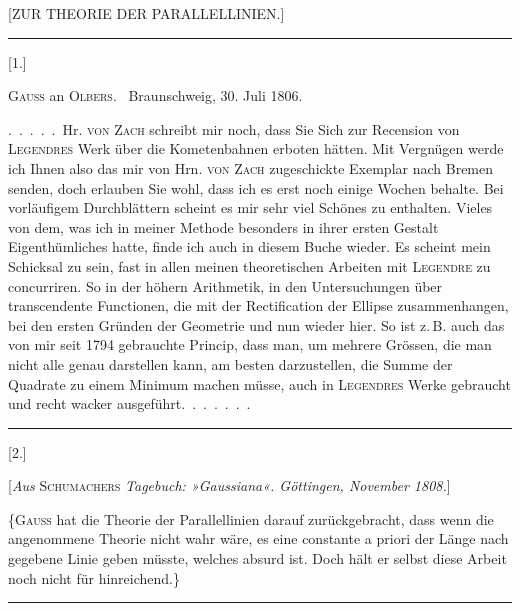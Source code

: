 \clearpage
{}\centerline{[ZUR THEORIE DER PARALLELLINIEN.]}

\bigskip
\hrule
\bigskip

\centerline{[1.]}

\smallskip

\centerline{\textsc{Gauss} an \textsc{Olbers}. \ Braunschweig, 30. Juli 1806.}

\smallskip

.\ .\ .\ .\ .\ Hr. \textsc{von Zach} schreibt mir noch, dass Sie Sich zur Recension von \textsc{Legendres} Werk über die Kometenbahnen erboten hätten. Mit Vergnügen werde ich Ihnen also das mir von Hrn. \textsc{von Zach} zugeschickte Exemplar nach Bremen senden, doch erlauben Sie wohl, dass ich es erst noch einige Wochen behalte. Bei vorläufigem Durchblättern scheint es mir sehr viel Schönes zu enthalten. Vieles von dem, was ich in meiner Methode besonders in ihrer ersten Gestalt Eigenthümliches hatte, finde ich auch in diesem Buche wieder. Es scheint mein Schicksal zu sein, fast in allen meinen theoretischen Arbeiten mit \textsc{Legendre} zu concurriren. So in der höhern Arithmetik, in den Untersuchungen über transcendente Functionen, die mit der Rectification der Ellipse zusammenhangen, bei den ersten Gründen der Geometrie und nun wieder hier. So ist z.\,B. auch das von mir seit 1794 gebrauchte Princip, dass man, um mehrere Grössen, die man nicht alle genau darstellen kann, am besten darzustellen, die Summe der Quadrate zu einem Minimum machen müsse, auch in \textsc{Legendres} Werke gebraucht und recht wacker ausgeführt.\ .\ .\ .\ .\ .\ .

\bigskip
\hrule
\bigskip

\centerline{[2.]}

\smallskip

\centerline{[\emph{Aus} \textsc{Schumachers} \emph{Tagebuch: »Gaussiana«. Göttingen, November 1808.}]}

\smallskip

\{\textsc{Gauss} hat die Theorie der Parallellinien darauf zurückgebracht, dass wenn die angenommene Theorie nicht wahr wäre, es eine constante a priori der Länge nach gegebene Linie geben müsste, welches absurd ist. Doch hält er selbst diese Arbeit noch nicht für hinreichend.\}

\bigskip
\hrule
